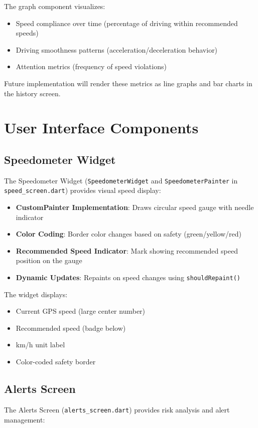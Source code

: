 The graph component visualizes:
\begin{itemize}
    \item Speed compliance over time (percentage of driving within recommended speeds)
    \item Driving smoothness patterns (acceleration/deceleration behavior)
    \item Attention metrics (frequency of speed violations)
\end{itemize}

Future implementation will render these metrics as line graphs and bar charts in the history screen.

\section{User Interface Components}

\subsection{Speedometer Widget}
The Speedometer Widget (\texttt{SpeedometerWidget} and \texttt{SpeedometerPainter} in \texttt{speed\_screen.dart}) provides visual speed display:

\begin{itemize}
    \item \textbf{CustomPainter Implementation}: Draws circular speed gauge with needle indicator
    \item \textbf{Color Coding}: Border color changes based on safety (green/yellow/red)
    \item \textbf{Recommended Speed Indicator}: Mark showing recommended speed position on the gauge
    \item \textbf{Dynamic Updates}: Repaints on speed changes using \texttt{shouldRepaint()}
\end{itemize}

The widget displays:
\begin{itemize}
    \item Current GPS speed (large center number)
    \item Recommended speed (badge below)
    \item km/h unit label
    \item Color-coded safety border
\end{itemize}

\subsection{Alerts Screen}
The Alerts Screen (\texttt{alerts\_screen.dart}) provides risk analysis and alert management:


